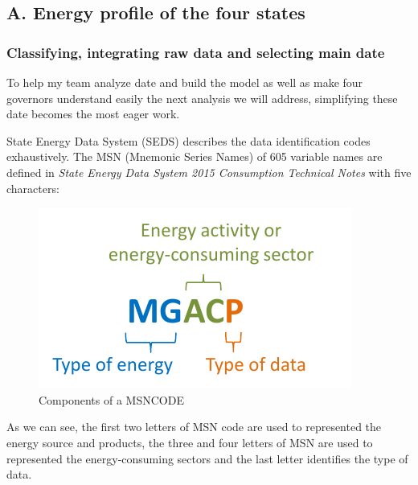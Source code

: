 \subsection{A. Energy profile of the four states}
\subsubsection{Classifying, integrating raw data and selecting main date}
To help my team analyze date and build the model as well as make four governors understand easily the next analysis we will address, simplifying these date becomes the most eager work.

State Energy Data System (SEDS) describes the data identification codes exhaustively. The MSN (Mnemonic Series Names) of 605 variable names are defined in \textit{State Energy Data System 2015 Consumption Technical Notes} with five characters:
\begin{figure}[H] 
    \centering 
    \includegraphics[width=0.3\linewidth]{fig/msn.pdf}
    \caption{Components of a MSNCODE}
    \label{fig: msn}
\end{figure}


As we can see, the first two letters of MSN code are used to represented the energy source and products, the three and four letters of MSN are used to represented the energy-consuming sectors and the last letter identifies the type of data.


